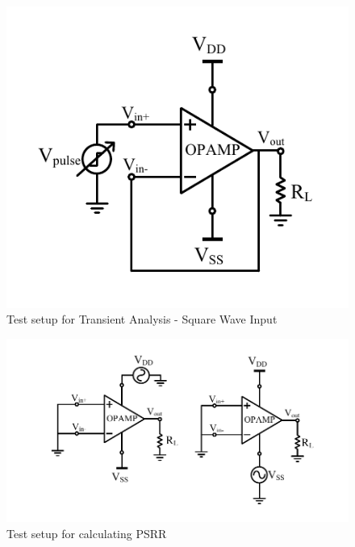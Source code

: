 \begin{figure} [H]
\centering
\includegraphics[scale=1]{Figures/Test_Benches/OPAMP/OPAMP_Slew.pdf}
\caption{Test setup for Transient Analysis - Square Wave Input}
\end{figure}

\begin{figure} [H]
\centering
\includegraphics[scale=1]{Figures/Test_Benches/OPAMP/OPAMP_PSRR.pdf}
\caption{Test setup for calculating PSRR}
\end{figure}

